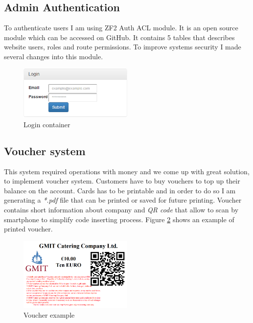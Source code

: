 	\subsection{Admin Authentication}
To authenticate users I am using ZF2 Auth ACL module. It is an open source module which can be accessed on GitHub. It contains 5 tables that describes website users, roles and route permissions. To improve systems security I made several changes into this module.
	~\cite{Website_authentication}

\begin{figure}[H]
	\centering
	\includegraphics[width=0.5\textwidth]{img/zf2/login-container.png}
	\caption{Login container}
	\label{fig:login-container}
\end{figure}
	
	\subsection{Voucher system}

This system required operations with money and we come up with great solution, to implement voucher system. Customers have to buy vouchers to top up their balance on the account. Cards has to be printable and in order to do so I am generating a \textit{*.pdf} file that can be printed or saved for future printing. Voucher contains short information about company and \textit{QR code} that allow to scan by smartphone to simplify code inserting process. Figure \ref{fig:voucher} shows an example of printed voucher.

\begin{figure}[H]
	\centering
	\includegraphics[width=0.5\textwidth]{img/zf2/voucher-example.png}
	\caption{Voucher example}
	\label{fig:voucher}
\end{figure}
	
